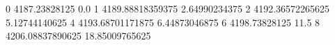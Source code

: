 0 4187.23828125 0.0
1 4189.88818359375 2.64990234375
2 4192.36572265625 5.12744140625
4 4193.68701171875 6.44873046875
6 4198.73828125 11.5
8 4206.08837890625 18.85009765625
